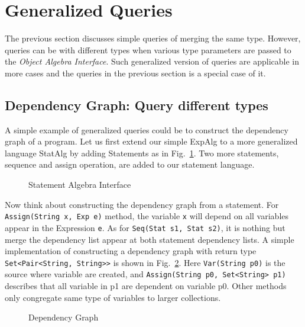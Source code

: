 \section{Generalized Queries}\label{sec:generalizedQueries}
The previous section discusses simple queries of merging the same type. However, queries can be with different types when various type parameters are passed to the \textit{Object Algebra Interface}. Such generalized version of queries are applicable in more cases and the queries in the previous section is a special case of it. 

\subsection{Dependency Graph: Query different types}\label{subsec:depGraph}
A simple example of generalized queries could be to construct the dependency graph of a program. Let us first extend our simple ExpAlg to a more generalized language StatAlg by adding Statements as in Fig.~\ref{statalg}. Two more statements, sequence and assign operation, are added to our statement language. 

\begin{figure}[tb]
\vspace{-.1in}
\caption{Statement Algebra Interface}
\label{statalg}
\end{figure}

Now think about constructing the dependency graph from a statement. For \lstinline{Assign(String x, Exp e)} method, the variable \lstinline{x} will depend on all variables appear in the Expression \lstinline{e}. As for \lstinline{Seq(Stat s1, Stat s2)}, it is nothing but merge the dependency list appear at both statement dependency lists. A simple implementation of constructing a dependency graph with return type \lstinline{Set<Pair<String, String>>} is shown in Fig.~\ref{deps1}. Here \lstinline{Var(String p0)} is the source where variable are created, and \lstinline{Assign(String p0, Set<String> p1)} describes that all variable in p1 are dependent on variable p0. Other methods only congregate same type of variables to larger collections. 

\begin{figure}[tb]
\vspace{-.1in}
\caption{Dependency Graph}
\label{deps1}
\end{figure}

